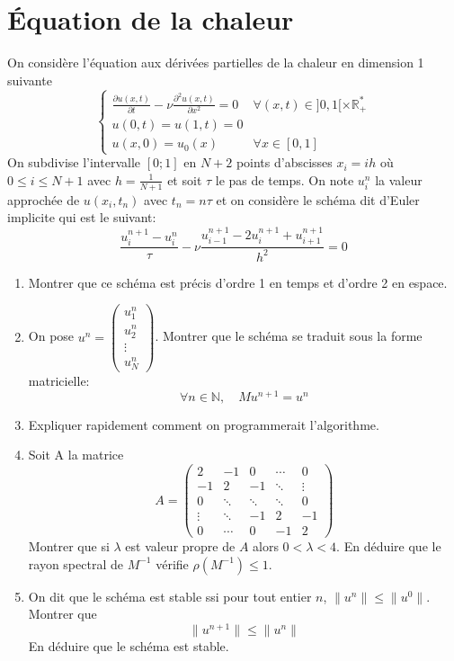 \documentclass[a4paper]{article}
\begin{document}
\section{Équation de la chaleur}
 On considère l'équation aux dérivées partielles de la chaleur en dimension 1   suivante
\[\left\{\begin{array}{ll}
\displaystyle \frac{\partial u(x,t)}{\partial t} -\nu \frac{\partial^2u(x,t)}{\partial x^2}=0 & \forall (x,t)\in ]0,1[\times \mathbb{R}_+^*\\
u(0,t)=u(1,t)=0&\\
u(x,0)=u_0(x) & \forall x \in [0,1]
\end{array}\right.
\]
 On subdivise l'intervalle $[0; 1]$ en $N+2$ points d'abscisses $x_i = ih$ où $0\leq i\leq N+1$ avec $h = \frac 1{N+1}$ et soit $\tau$ le pas de temps.  On note $u^n_i$ la valeur approchée de $u(x_i,t_n)$ avec $t_n=n\tau$ et on considère le schéma dit d'Euler implicite qui est le suivant:
 \[ \frac{u_{i}^{n+1}-u_{i}^n}{\tau}-\nu \frac{u_{i-1}^{n+1}-2u_i^{n+1}+u_{i+1}^{n+1}}{h^2}=0
\]
  

\begin{enumerate}
\item Montrer que ce schéma est précis d'ordre 1 en temps et d'ordre 2 en espace.

\item On pose $u^n=\left(\begin{array}{c}  u_1^n  \\ u_2^n \\\vdots \\ u_N^n \end{array}\right)$. Montrer que le schéma se traduit sous la forme matricielle:
\[\forall n\in \mathbb{N},\quad M u^{n+1} = u^n\]

\item Expliquer rapidement comment on programmerait l'algorithme.
\item Soit A la matrice
\[A=
\left(\begin{array}{ccccc}
2&-1&0&\cdots&0\\
-1&2&-1&\ddots&\vdots\\
0&  \ddots &\ddots&\ddots&0\\
\vdots &\ddots &-1&2&-1\\
   0&\cdots &0&-1 &2
\end{array}\right)
\] 
Montrer que si $\lambda$ est valeur propre de $A$ alors $0<\lambda<4$. En déduire que le rayon spectral de $M^{-1}$ vérifie $\rho(M^{-1})\leq 1$.
\item On dit que le schéma est stable ssi pour tout entier $n$, $\|u^n\|\leq \|u^0\|$. Montrer que 
\[\|u^{n+1}\|\leq \|u^n\|\]
En déduire que le schéma est stable.
\end{enumerate}
\end{document}
